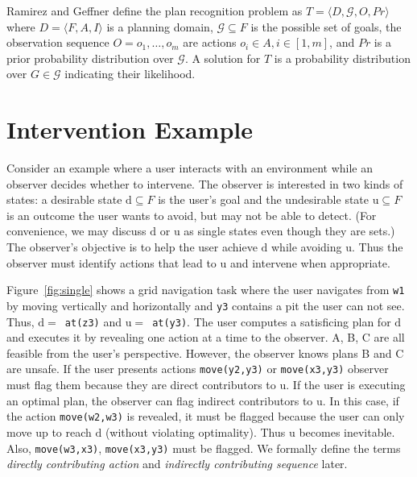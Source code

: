 \documentclass[letterpaper]{article}
\theoremstyle{plain}
\begin{document}
Ramirez and Geffner  define the plan recognition problem as $T= \langle D, \mathcal{G}, O, Pr \rangle$ where $D=\langle F, A, I \rangle$ is a planning domain, $\mathcal{G} \subseteq F$ is the possible set of goals, the observation sequence $O = o_1, \ldots , o_m$ are actions $o_i \in A, i \in[1,m]$, and $Pr$ is a prior probability distribution over $\mathcal{G}$. A solution for $T$ is a probability distribution over $G \in \mathcal{G}$ indicating their likelihood. 



\section{Intervention Example}
Consider an example where a user interacts with an environment while an observer decides whether to intervene.
The observer is interested in two kinds of states:  a desirable state $\mathrm{d} \subseteq F$ is the user's goal and the undesirable state $\mathrm{u} \subseteq F$  is an outcome the user wants to avoid, but may not be able to detect.
(For convenience, we may discuss $\mathrm{d}$ or $\mathrm{u}$ as single states even though they are sets.)
The observer's objective is to help the user achieve $\mathrm{d}$ while avoiding $\mathrm{u}$.
Thus the observer must identify actions that lead to $\mathrm{u}$ and intervene when appropriate.

Figure~\ref{fig:single} shows a grid navigation task where the user navigates from \texttt{w1} by moving vertically and horizontally and \texttt{y3} contains a pit the user can not see.
Thus, \mbox{$\mathrm{d}=$ \texttt{at(z3)}} and \mbox{$\mathrm{u}=$ \texttt{at(y3)}}. The user computes a satisficing plan for $\mathrm{d}$ and executes it by revealing one action at a time to the observer. A, B, C are all feasible from the user's perspective.
However, the observer knows plans B and C are unsafe.
If the user presents actions \texttt{move(y2,y3)} or \texttt{move(x3,y3)} observer must flag them because they are direct contributors to $\mathrm{u}$.
If the user is executing an optimal plan, the observer can flag indirect contributors to $\mathrm{u}$. In this case, if the action \texttt{move(w2,w3)} is revealed, it must be flagged because the user can only move up to reach $\mathrm{d}$ (without violating optimality). Thus $\mathrm{u}$ becomes inevitable. Also, \texttt{move(w3,x3)}, \texttt{move(x3,y3)} must be flagged. We formally define the terms \textit{directly contributing action} and \textit{indirectly contributing sequence} later.
\end{document}
